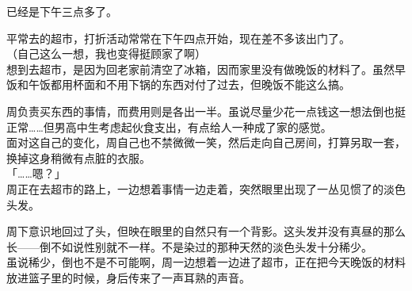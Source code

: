 已经是下午三点多了。

平常去的超市，打折活动常常在下午四点开始，现在差不多该出门了。\\

（自己这么一想，我也变得挺顾家了啊）\\

想到去超市，是因为回老家前清空了冰箱，因而家里没有做晚饭的材料了。虽然早饭和午饭都用杯面和不用下锅的东西对付了过去，但晚饭不能这么搞。

周负责买东西的事情，而费用则是各出一半。虽说尽量少花一点钱这一想法倒也挺正常……但男高中生考虑起伙食支出，有点给人一种成了家的感觉。\\

面对这自己的变化，周自己也不禁微微一笑，然后走向自己房间，打算另取一套，换掉这身稍微有点脏的衣服。\\



「……嗯？」\\

周正在去超市的路上，一边想着事情一边走着，突然眼里出现了一丛见惯了的淡色头发。

周下意识地回过了头，但映在眼里的自然只有一个背影。这头发并没有真昼的那么长——倒不如说性别就不一样。不是染过的那种天然的淡色头发十分稀少。\\

虽说稀少，倒也不是不可能啊，周一边想着一边进了超市，正在把今天晚饭的材料放进篮子里的时候，身后传来了一声耳熟的声音。\\

